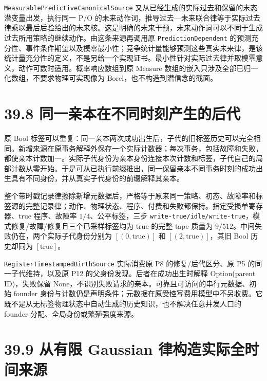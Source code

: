 \documentclass[
  11pt,
  oneside]{book}
\begin{document}
\nolinkurl{MeasurablePredictiveCanonicalSource} 又从已经生成的实际过去和保留的末态潜变量出发，执行同一 P/O 的未来动作词，推导过去---未来联合律等于实际过去律乘以最后后验给出的未来核。这是明确的未来干预，未来动作词可以不同于生成过去所用策略的继续动作。由这条来源再调用原 \nolinkurl{PredictionDependent} 的预测充分性、事件条件期望以及模零最小性；竞争统计量能够预测这些真实未来律，是该统计量充分性的定义，不是另给一个实现证书。最小性针对实际过去律并取模零意义，动作可数时适用。概率响应数组到原 Measure 数组的嵌入只涉及全部已归一化数组，不要求物理可实现像为 Borel，也不构造到潜信念的截面。

\section{39.8 同一亲本在不同时刻产生的后代}\label{ux540cux4e00ux4eb2ux672cux5728ux4e0dux540cux65f6ux523bux4ea7ux751fux7684ux540eux4ee3}

原 Bool 标签可以重复：同一亲本两次成功出生后，子代的旧标签历史可以完全相同。新增来源在原事务解释外保存一个实际计数器；每次事务，包括故障和失败，都使亲本计数加一。实际子代身份为亲本身份连接本次计数和标签，子代自己的局部计数从零开始。于是可从已执行前缀推出，同一保留亲本不同事务时刻的成功出生具有不同身份，并从真实子代身份的前缀解释其亲本。

整个带时戳记录律擦除新增元数据后，严格等于原来同一策略、初态、故障率和标签源的完整记录律；动作、物理状态、程序、付费和失败都保持。指定受损单寄存器、true 程序、故障率 \(1/4\)、公平标签，三步 \nolinkurl{write-true/idle/write-true}，模式修复/故障/修复且三个已采样标签均为 true 的完整 tape 质量为 \(9/512\)。中间失败仍在，两个实际子代身份分别为 \([(0,\mathrm{true})]\) 和 \([(2,\mathrm{true})]\)，其旧 Bool 历史却同为 \([\mathrm{true}]\)。

\nolinkurl{RegisterTimestampedBirthSource} 实际消费原 P8 的修复/后代区分、原 P5 的同一子代维持，以及原 P12 的父身份发现。后者在成功出生时解释 Option(parent ID)，失败保留 None，不识别失败请求的亲本。可靠且可访问的串行元数据、初始 founder 身份与计数仍是声明条件；元数据在原受控写费用模型中不另收费。它既不是从无标签物理状态中自动生成的历史知识，也不解决任意并发人口的 founder 分配、全局身份或繁殖强度来源。

\section{39.9 从有限 Gaussian 律构造实际全时间来源}\label{ux4eceux6709ux9650-gaussian-ux5f8bux6784ux9020ux5b9eux9645ux5168ux65f6ux95f4ux6765ux6e90}
\end{document}
